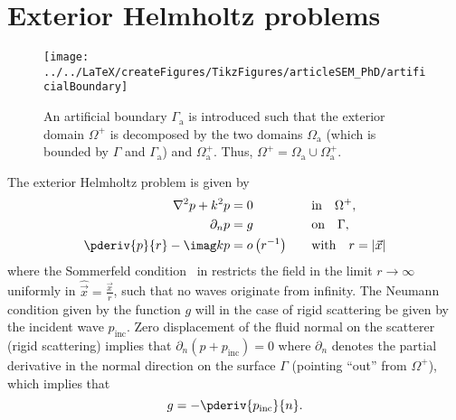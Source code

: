 \section{Exterior Helmholtz problems}
%
\begin{figure}
	\centering
	\texttt{[image: ../../LaTeX/createFigures/TikzFigures/articleSEM\_PhD/artificialBoundary]}
	\caption[Illustration of artificial boundary]{An artificial boundary $\Gamma_{\mathrm{a}}$ is introduced such that the exterior domain $\Omega^+$ is decomposed by the two domains $\Omega_{\mathrm{a}}$ (which is bounded by $\Gamma$ and $\Gamma_{\mathrm{a}}$) and $\Omega_{\mathrm{a}}^+$. Thus, $\Omega^+ = \Omega_{\mathrm{a}} \cup \Omega_{\mathrm{a}}^+$.}
	\label{Fig5:artificialBoundary}
\end{figure}
The exterior Helmholtz problem is given by
\begin{alignat}{3}
	\nabla^2 p + k^2 p &= 0 	&&\text{in}\quad \Omega^+,\label{Eq5:HelmholtzEqn}\\
	\partial_n p &= g						&&\text{on}\quad \Gamma,\label{Eq5:HelmholtzEqnNeumannCond}\\
	\pderiv{p}{r}-\imag k p &= o\left(r^{-1}\right)\quad &&\text{with}\quad r=|\vec{x}|\label{Eq5:sommerfeldCond}
\end{alignat}
where the Sommerfeld condition~\cite{Sommerfeld1949pde} in  restricts the field in the limit $r\to\infty$ uniformly in $\hat{\vec{x}}=\frac{\vec{x}}{r}$, such that no waves originate from infinity. The Neumann condition given by the function $g$ will in the case of rigid scattering be given by the incident wave $p_{\mathrm{inc}}$. Zero displacement of the fluid normal on the scatterer (rigid scattering) implies that $\partial_n(p+p_{\mathrm{inc}}) = 0$ where $\partial_n$ denotes the partial derivative in the normal direction on the surface $\Gamma$ (pointing ``out'' from $\Omega^+$), which implies that
\begin{equation}
	g = -\pderiv{p_{\mathrm{inc}}}{n}.
\end{equation}
